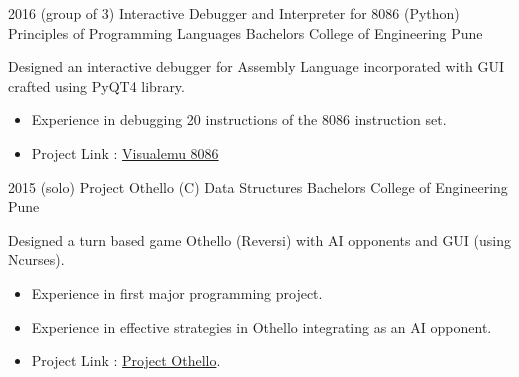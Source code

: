         \cventry
            {2016 (group of 3)} %
            {Interactive Debugger and Interpreter for 8086 (Python)} %
            {Principles of Programming Languages} %
            {Bachelors} 
            {College of Engineering Pune} %
            {
                Designed an interactive debugger for Assembly Language incorporated with GUI crafted using PyQT4 library.
                \begin{itemize} %
                    \item Experience in debugging 20 instructions of the 8086 instruction set.
                    \item Project Link : \href{https://github.com/jaag5678/visualemu8086}{Visualemu 8086}
                \end{itemize}
            }
            {}

        \cventry
            {2015 (solo)} %
            {Project Othello (C)} %
            {Data Structures} %
            {Bachelors} 
            {College of Engineering Pune} %
            {
                Designed a turn based game Othello (Reversi) with AI opponents and GUI (using Ncurses).
                \begin{itemize} %
                    \item Experience in first major programming project.
                    \item Experience in effective strategies in Othello integrating as an AI opponent.
                    \item Project Link : \href{https://github.com/jaag5678/Reverse-Rebirth.git}{Project Othello}.
                \end{itemize}
            }
            {}
        
    